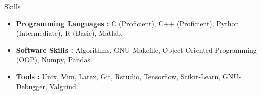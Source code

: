 \documentclass[]{mcdowellcv}
\begin{document}
	\vspace{-4mm}
	\newline
	\begin{cvsection}{Skills}
		\begin{cvsubsection}{}{}{}	
			\begin{itemize}
				\item \textbf{Programming Languages : }C (Proficient), C++ (Proficient), Python (Intermediate), R (Basic), Matlab.
				\item \textbf{Software Skills : } Algorithms, GNU-Makefile, Object Oriented Programming (OOP), Numpy, Pandas.
				\item \textbf{Tools : } Unix, Vim, Latex, Git, Rstudio, Tensorflow, Scikit-Learn, GNU-Debugger, Valgrind.
			\end{itemize}
		\end{cvsubsection}
	\end{cvsection}
	\vspace{-1mm}
	
\end{document}
